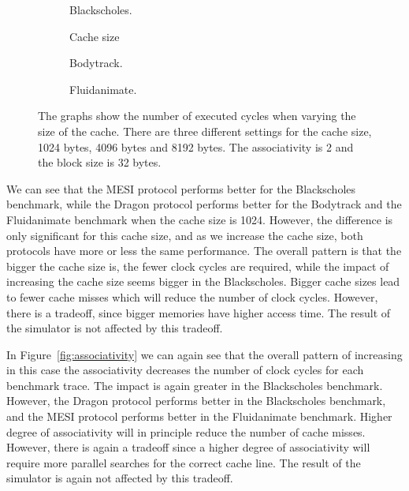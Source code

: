 \begin{figure}[H]
    \centering
    \begin{subfigure}[b]{0.33\textwidth}
        \centering
        \caption{Blackscholes.}\label{fig:cache_size_blackscholes}
    \end{subfigure}%
    \hfill
    \begin{subfigure}[b]{0.33\textwidth}
        \centering
        Cache size\par\medskip
        \caption{Bodytrack.}\label{fig:cache_size_bodytrack}
    \end{subfigure}%
    \hfill
    \begin{subfigure}[b]{0.33\textwidth}
        \centering
        \caption{Fluidanimate.}\label{fig:cache_size_fluidanimate}
    \end{subfigure}
    \hfill
    \caption{The graphs show the number of executed cycles when varying the size of the cache. There are three different settings for the cache size, 1024 bytes, 4096 bytes and 8192 bytes. The associativity is 2 and the block size is 32 bytes.}\label{fig:cache_size}
\end{figure}


We can see that the MESI protocol performs better for the Blackscholes benchmark,
while the Dragon protocol performs better for the Bodytrack and the Fluidanimate
benchmark when the cache size is 1024. However, the difference is only significant
for this cache size, and as we increase the cache size, both protocols have more
or less the same performance. The overall pattern is that the bigger the cache size
is, the fewer clock cycles are required, while the impact of increasing the cache
size seems bigger in the Blackscholes. Bigger cache sizes lead to fewer cache misses
which will reduce the number of clock cycles. However, there is a tradeoff, since
bigger memories have higher access time. The result of the simulator is not affected
by this tradeoff.

In Figure~\ref{fig:associativity} we can again see that the overall pattern of
increasing in this case the associativity decreases the number of clock cycles
for each benchmark trace. The impact is again greater in the Blackscholes benchmark.
However, the Dragon protocol performs better in the Blackscholes benchmark, and the
MESI protocol performs better in the Fluidanimate benchmark. Higher degree of associativity
will in principle reduce the number of cache misses. However, there is again a tradeoff
since a higher degree of associativity will require more parallel searches for the correct
cache line. The result of the simulator is again not affected by this tradeoff.

